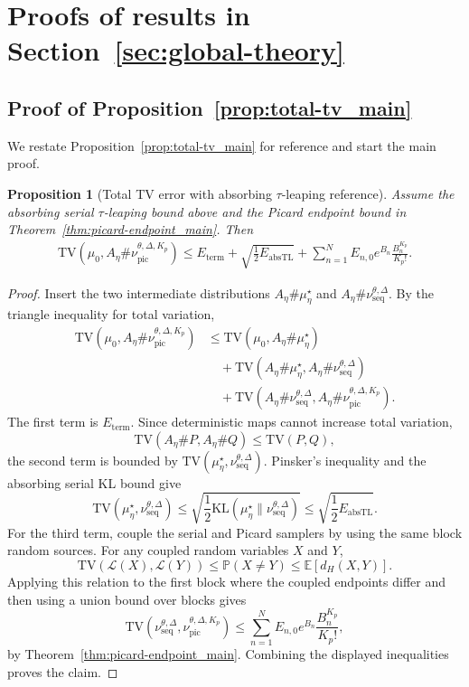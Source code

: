 \documentclass{article}
\newtheorem{proposition}{Proposition}[section]
\newcommand{\TV}{\mathrm{TV}}
\newcommand{\Law}{\mathcal{L}}
\begin{document}
\section{Proofs of results in Section~\ref{sec:global-theory}}

\subsection{Proof of Proposition~\ref{prop:total-tv_main}}
\label{appd:total_tv}

We restate Proposition~\ref{prop:total-tv_main} for reference and start the main proof.

\begin{proposition}[Total TV error with absorbing $\tau$-leaping reference]
\label{prop:total-tv}
Assume the absorbing serial $\tau$-leaping bound above and the Picard endpoint bound in Theorem~\ref{thm:picard-endpoint_main}.  Then
\[
\begin{aligned}
\TV(\mu_0,A_\eta\#\nu_{\mathrm{pic}}^{\theta,\Delta,K_p})
\le
E_{\mathrm{term}}+\sqrt{\frac12E_{\mathrm{absTL}}}+
\sum_{n=1}^N E_{n,0}e^{B_n}\frac{B_n^{K_p}}{K_p!}.
\end{aligned}
\]
\end{proposition}
\begin{proof}
Insert the two intermediate distributions $A_\eta\#\mu_\eta^\star$ and $A_\eta\#\nu_{\mathrm{seq}}^{\theta,\Delta}$.  By the triangle inequality for total variation,
\[
\begin{aligned}
\TV(\mu_0,A_\eta\#\nu_{\mathrm{pic}}^{\theta,\Delta,K_p})
&\le
\TV(\mu_0,A_\eta\#\mu_\eta^\star) \\
&\quad+
\TV(A_\eta\#\mu_\eta^\star,A_\eta\#\nu_{\mathrm{seq}}^{\theta,\Delta}) \\
&\quad+
\TV(A_\eta\#\nu_{\mathrm{seq}}^{\theta,\Delta},A_\eta\#\nu_{\mathrm{pic}}^{\theta,\Delta,K_p}).
\end{aligned}
\]
The first term is $E_{\mathrm{term}}$.  Since deterministic maps cannot increase total variation,
\[
\TV(A_\eta\#P,A_\eta\#Q)
\le
\TV(P,Q),
\]
the second term is bounded by $\TV(\mu_\eta^\star,\nu_{\mathrm{seq}}^{\theta,\Delta})$.  Pinsker's inequality and the absorbing serial KL bound give
\[
\TV(\mu_\eta^\star,\nu_{\mathrm{seq}}^{\theta,\Delta})
\le
\sqrt{\frac12\mathrm{KL}(\mu_\eta^\star\|\nu_{\mathrm{seq}}^{\theta,\Delta})}
\le
\sqrt{\frac12E_{\mathrm{absTL}}}.
\]
For the third term, couple the serial and Picard samplers by using the same block random sources.  For any coupled random variables $X$ and $Y$,
\[
\TV(\Law(X),\Law(Y))
\le
\mathbb P(X\ne Y)
\le
\mathbb E[d_H(X,Y)].
\]
Applying this relation to the first block where the coupled endpoints differ and then using a union bound over blocks gives
\[
\TV(\nu_{\mathrm{seq}}^{\theta,\Delta},\nu_{\mathrm{pic}}^{\theta,\Delta,K_p})
\le
\sum_{n=1}^N E_{n,0}e^{B_n}\frac{B_n^{K_p}}{K_p!},
\]
by Theorem~\ref{thm:picard-endpoint_main}.  Combining the displayed inequalities proves the claim.
\end{proof}
\end{document}
